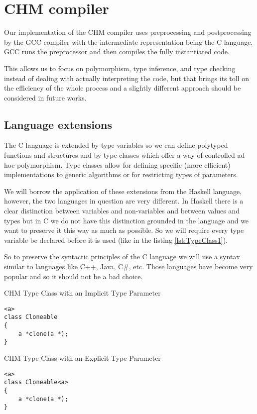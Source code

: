 \chapter{CHM compiler}
\label{chap:compilerCHM}

Our implementation of the CHM compiler uses preprocessing and postprocessing by the GCC compiler with the intermediate representation being the C language. GCC runs the preprocessor and then compiles the fully instantiated code.

This allows us to focus on polymorphism, type inference, and type checking instead of dealing with actually interpreting the code, but that brings its toll on the efficiency of the whole process and a slightly different approach should be considered in future works.

\section{Language extensions}

The C language is extended by type variables so we can define polytyped functions and structures and by type classes which offer a way of controlled ad-hoc polymorphism. Type classes allow for defining specific (more efficient) implementations to generic algorithms or for restricting types of parameters.

We will borrow the application of these extensions from the Haskell language, however, the two languages in question are very different. In Haskell there is a clear distinction between variables and non-variables and between values and types but in C we do not have this distinction grounded in the language and we want to preserve it this way as much as possible. So we will require every type variable be declared before it is used (like in the listing \ref{lst:TypeClass1}).

So to preserve the syntactic principles of the C language we will use a syntax similar to languages like C++, Java, C\#, etc. Those languages have become very popular and so it should not be a bad choice.

\begin{listing}
\caption{CHM Type Class with an Implicit Type Parameter}
\label{lst:TypeClass1}
\begin{lstlisting}
<a>
class Cloneable
{
    a *clone(a *);
}
\end{lstlisting}
\end{listing}

\begin{listing}
\caption{CHM Type Class with an Explicit Type Parameter}
\label{lst:TypeClass2}
\begin{lstlisting}
<a>
class Cloneable<a>
{
    a *clone(a *);
}
\end{lstlisting}
\end{listing}

